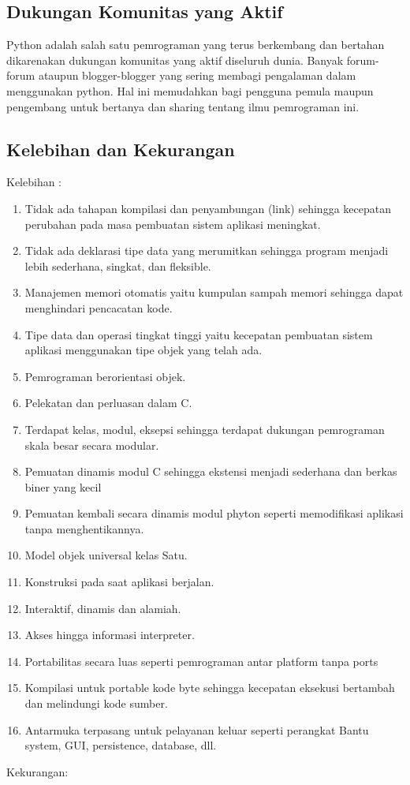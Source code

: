\begin{enumerate}
\subsection{Dukungan Komunitas yang Aktif}
Python adalah salah satu pemrograman yang terus berkembang dan bertahan dikarenakan dukungan komunitas yang aktif diseluruh dunia. Banyak forum-forum ataupun blogger-blogger yang sering membagi pengalaman dalam menggunakan python. Hal ini memudahkan bagi pengguna pemula maupun pengembang untuk bertanya dan sharing tentang ilmu pemrograman ini.

\subsection{Kelebihan dan Kekurangan}
Kelebihan :
\begin{enumerate}
\item Tidak ada tahapan kompilasi dan penyambungan (link) sehingga kecepatan perubahan pada masa pembuatan sistem aplikasi meningkat.
\item Tidak ada deklarasi tipe data yang merumitkan sehingga program menjadi lebih sederhana, singkat, dan fleksible.
\item Manajemen memori otomatis yaitu kumpulan sampah memori sehingga dapat menghindari pencacatan kode.
\item Tipe data dan operasi tingkat tinggi yaitu kecepatan pembuatan sistem aplikasi menggunakan tipe objek yang telah ada.
\item Pemrograman berorientasi objek.
\item Pelekatan dan perluasan dalam C.
\item Terdapat kelas, modul, eksepsi sehingga terdapat dukungan pemrograman skala besar secara modular.
\item Pemuatan dinamis modul C sehingga ekstensi menjadi sederhana dan berkas biner yang kecil
\item Pemuatan kembali secara dinamis modul phyton seperti memodifikasi aplikasi tanpa menghentikannya.
\item Model objek universal kelas Satu.
\item Konstruksi pada saat aplikasi berjalan.
\item Interaktif, dinamis dan alamiah.
\item Akses hingga informasi interpreter.

\item Portabilitas secara luas seperti pemrograman antar platform tanpa ports
\item Kompilasi untuk portable kode byte sehingga kecepatan eksekusi bertambah dan melindungi kode sumber.
\item Antarmuka terpasang untuk pelayanan keluar seperti perangkat Bantu system, GUI, persistence, database, dll.
\end{enumerate}
Kekurangan:
\begin{enumerate}


\end{enumerate}
\end{enumerate}
